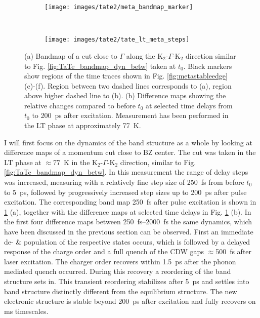 \begin{figure}[t!]
	\centering
	\begin{subfigure}[b]{0.25\textwidth}
		\texttt{[image: images/tate2/meta\_bandmap\_marker]}
		\caption{}
	\end{subfigure}
	\\
	\begin{subfigure}[b]{\textwidth}
		\texttt{[image: images/tate2/tate\_lt\_meta\_steps]}
		\caption{}
	\end{subfigure}
	\caption{(a) Bandmap of a cut close to $\Gamma$ along the K$_2$-$\Gamma$-K$_2$ direction similar to Fig. \ref{fig:TaTe_bandmap_dyn_betw} taken at $t_0$. Black markers show regions of the time traces shown in Fig. \ref{fig:metastableedge} (c)-(f). Region between two dashed lines corresponds to (a), region above higher dashed line to (b). (b) Difference maps showing the relative changes compared to before $t_0$ at selected time delays from $t_0$ to \qty{200}{\pico\second} after excitation. Measurement has been performed in the LT phase at approximately \qty{77}{\kelvin}.}
	\label{fig:tateltmetasteps}
\end{figure}

I will first focus on the dynamics of the band structure as a whole by looking at difference maps of a momentum cut close to BZ center.
The cut was taken in the LT phase at $\approx$\qty{77}{\kelvin} in the  K$_2$-$\Gamma$-K$_2$ direction, similar to Fig. \ref{fig:TaTe_bandmap_dyn_betw}.
In this measurement the range of delay steps was increased, measuring with a relatively fine step size of \qty{250}{\femto\second} from before $t_0$ to \qty{5}{\pico\second}, followed by progressively increased step sizes up to \qty{200}{\pico\second} after pulse excitation.
The corresponding band map \qty{250}{\femto\second} after pulse excitation is shown in \ref{fig:tateltmetasteps} (a), together with the difference maps at selected time delays in Fig. \ref{fig:tateltmetasteps} (b).
In the first four difference maps between \qtyrange{250}{2000}{\femto\second} the same dynamics, which have been discussed in the previous section can be observed.
First an immediate de- \& population of the respective states occurs, which is followed by a delayed response of the charge order and a full quench of the CDW gaps $\approx$\qty{500}{\femto\second} after laser excitation.
The charger order recovers within \qty{1.5}{\pico\second} after the phonon mediated quench occurred.
During this recovery a reordering of the band structure sets in.
This transient reordering stabilizes after \qty{5}{\pico\second} and settles into band structure distinctly different from the equilibrium structure.
The new electronic structure is stable beyond \qty{200}{\pico\second} after excitation and fully recovers on \unit{\milli\second} timescales.

